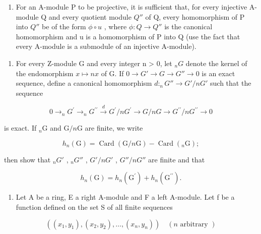 \begin{enumerate}
\def\labelenumi{(\alph{enumi})}
\setcounter{enumi}{1}
\tightlist
\item
  For an A-module P to be projective, it is sufficient that, for every injective A-module Q and every quotient module \(Q''\) of Q, every homomorphism of P into \(Q''\) be of the form \(\phi \circ u\) , where \(\phi: Q \to Q''\) is the canonical homomorphism and u is a homomorphism of P into Q (use the fact that every A-module is a submodule of an injective A-module).
\end{enumerate}

\begin{enumerate}
\def\labelenumi{\arabic{enumi}.}
\setcounter{enumi}{25}
\tightlist
\item
  For every Z-module G and every integer n \textgreater{} 0, let \(_{n}G\) denote the kernel of the endomorphism \(x \mapsto nx\) of G. If \(0 \to G' \to G \to G'' \to 0\) is an exact sequence, define a canonical homomorphism \(d:_{n}G'' \to G'/nG'\) such that the sequence
\end{enumerate}

\[
0 \longrightarrow_ {n} G ^ {\prime} \longrightarrow_ {n} G ^ {\prime \prime} \stackrel {d} {\longrightarrow} G ^ {\prime} / n G ^ {\prime} \longrightarrow G / n G \longrightarrow G ^ {\prime \prime} / n G ^ {\prime \prime} \longrightarrow 0
\]

is exact. If \(_n\mathrm{G}\) and \(\mathrm{G} / n\mathrm{G}\) are finite, we write

\[
h _ {n} (\mathrm{G}) = \operatorname{Card} (\mathrm{G} / n \mathrm{G}) - \operatorname{Card} (_ {n} \mathrm{G});
\]

then show that \(_{n}G'\) , \(_{n}G''\) , \(G'/nG'\) , \(G''/nG''\) are finite and that

\[
h _ {n} (\mathrm{G}) = h _ {n} \left(\mathrm{G} ^ {\prime}\right) + h _ {n} \left(\mathrm{G} ^ {\prime \prime}\right).
\]

\BourbakiExercisesSection

\begin{enumerate}
\def\labelenumi{\arabic{enumi}.}
\tightlist
\item
  Let A be a ring, E a right A-module and F a left A-module. Let f be a function defined on the set S of all finite sequences
\end{enumerate}

\[
((x _ {1}, y _ {1}), (x _ {2}, y _ {2}), \dots , (x _ {n}, y _ {n})) \quad (n \text {   arbitrary })
\]

